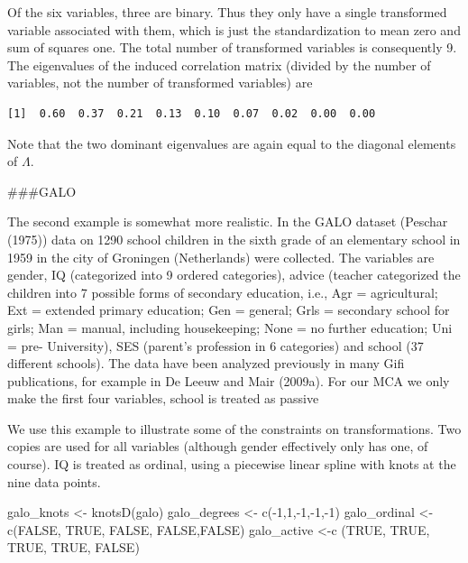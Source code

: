 \documentclass[
  12pt,
  letterpaper,
  DIV=11,
  numbers=noendperiod]{scrreprt}
\newenvironment{Shaded}{\begin{snugshade}}{\end{snugshade}}
\newcommand{\ConstantTok}[1]{\textcolor[rgb]{0.56,0.35,0.01}{#1}}
\newcommand{\DecValTok}[1]{\textcolor[rgb]{0.68,0.00,0.00}{#1}}
\newcommand{\FunctionTok}[1]{\textcolor[rgb]{0.28,0.35,0.67}{#1}}
\newcommand{\NormalTok}[1]{\textcolor[rgb]{0.00,0.23,0.31}{#1}}
\newcommand{\OtherTok}[1]{\textcolor[rgb]{0.00,0.23,0.31}{#1}}
\newcommand{\SpecialCharTok}[1]{\textcolor[rgb]{0.37,0.37,0.37}{#1}}
\begin{document}
Of the six variables, three are binary. Thus they only have a single
transformed variable associated with them, which is just the
standardization to mean zero and sum of squares one. The total number of
transformed variables is consequently 9. The eigenvalues of the induced
correlation matrix (divided by the number of variables, not the number
of transformed variables) are

\begin{verbatim}
[1]  0.60  0.37  0.21  0.13  0.10  0.07  0.02  0.00  0.00
\end{verbatim}

Note that the two dominant eigenvalues are again equal to the diagonal
elements of \(\Lambda\).

\#\#\#GALO

The second example is somewhat more realistic. In the GALO dataset
(Peschar (1975)) data on 1290 school children in the sixth grade of an
elementary school in 1959 in the city of Groningen (Netherlands) were
collected. The variables are gender, IQ (categorized into 9 ordered
categories), advice (teacher categorized the children into 7 possible
forms of secondary education, i.e., Agr = agricultural; Ext = extended
primary education; Gen = general; Grls = secondary school for girls; Man
= manual, including housekeeping; None = no further education; Uni =
pre- University), SES (parent's profession in 6 categories) and school
(37 different schools). The data have been analyzed previously in many
Gifi publications, for example in De Leeuw and Mair (2009a). For our MCA
we only make the first four variables, school is treated as passive

We use this example to illustrate some of the constraints on
transformations. Two copies are used for all variables (although gender
effectively only has one, of course). IQ is treated as ordinal, using a
piecewise linear spline with knots at the nine data points.

\begin{Shaded}
\begin{Highlighting}[]
\NormalTok{galo\_knots }\OtherTok{\textless{}{-}} \FunctionTok{knotsD}\NormalTok{(galo)}
\NormalTok{galo\_degrees }\OtherTok{\textless{}{-}} \FunctionTok{c}\NormalTok{(}\SpecialCharTok{{-}}\DecValTok{1}\NormalTok{,}\DecValTok{1}\NormalTok{,}\SpecialCharTok{{-}}\DecValTok{1}\NormalTok{,}\SpecialCharTok{{-}}\DecValTok{1}\NormalTok{,}\SpecialCharTok{{-}}\DecValTok{1}\NormalTok{)}
\NormalTok{galo\_ordinal }\OtherTok{\textless{}{-}} \FunctionTok{c}\NormalTok{(}\ConstantTok{FALSE}\NormalTok{, }\ConstantTok{TRUE}\NormalTok{, }\ConstantTok{FALSE}\NormalTok{, }\ConstantTok{FALSE}\NormalTok{,}\ConstantTok{FALSE}\NormalTok{)}
\NormalTok{galo\_active }\OtherTok{\textless{}{-}}\FunctionTok{c}\NormalTok{ (}\ConstantTok{TRUE}\NormalTok{, }\ConstantTok{TRUE}\NormalTok{, }\ConstantTok{TRUE}\NormalTok{, }\ConstantTok{TRUE}\NormalTok{, }\ConstantTok{FALSE}\NormalTok{)}
\end{Highlighting}
\end{Shaded}
\end{document}
